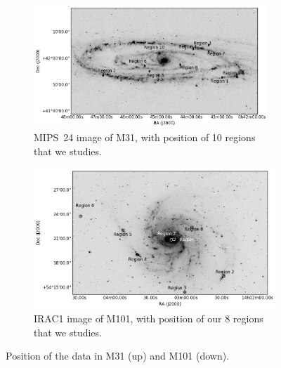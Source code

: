 \begin{figure}
  \begin{subfigure}[b]{0.5\textwidth}
        \centering
        \includegraphics[width=0.97\textwidth]{../images0.01/M31/M31.png}
        \caption{MIPS~24 image of M31, with position of 10 regions that we studies.}
        \label{fig: regions in m31}
    \end{subfigure}
    \hfill
    \begin{subfigure}[b]{0.5\textwidth}
        \includegraphics[width=\textwidth]{../images0.01/M101/M101.png}
        \caption{IRAC1 image of M101, with position of our 8 regions that we studies.}
    \label{fig: regions in m101}
    \end{subfigure}
    \caption{Position of the data in M31 (up) and M101 (down).}
\end{figure}


